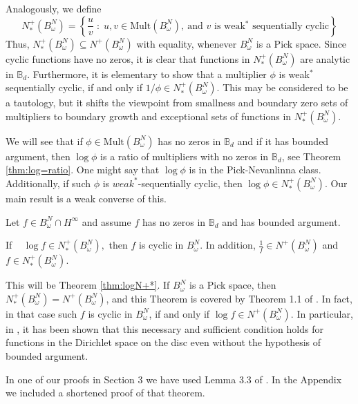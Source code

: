 \documentclass{article}
\numberwithin{equation}{section}
\newcommand{\Bd}{\mathbb B_d}
\begin{document}
Analogously, we define
\begin{equation}
N^{+}_{\ast}(B^{N}_{\omega})
=
\left\{
\frac{u}{v} \;:\; u, v \in \mathrm{Mult}(B^{N}_{\omega}),
\ \text{and } v \text{ is weak$^\ast$ sequentially cyclic}
\right\}
\end{equation}
Thus, $N^{+}_{\ast}(B^{N}_{\omega})\subseteq N^{+}(B^{N}_{\omega})$ with equality, whenever $B^N_\omega$ is a Pick space. Since cyclic functions have no zeros, it is clear that functions in $N^{+}_{\ast}(B^{N}_{\omega})$ are analytic in $\Bd$. Furthermore, it is elementary to show that a multiplier $\phi$ is weak$^\ast$ sequentially cyclic, if and only if $1/\phi\in N^{+}_{\ast}(B^{N}_{\omega})$. This may be considered to be a tautology, but it shifts the viewpoint from smallness and boundary zero sets of multipliers to boundary growth and exceptional sets of functions in $N^{+}_{\ast}(B^{N}_{\omega})$.


We will see that if  $\phi\in \mathrm{Mult}(B^{N}_{\omega})$ has  no zeros in  $\mathbb{B}_d$ and if it  has bounded argument, then  $\log \phi $ is a ratio of multipliers with no zeros in $\mathbb{B}_d$, see Theorem \ref{thm:log=ratio}. One might say that $\log \phi$ is in the Pick-Nevanlinna class. Additionally, if such $\phi$ is $weak^\ast$-sequentially cyclic, then $\log \phi \in N^{+}_{\ast}(B^{N}_{\omega})$. 
Our main result is a weak converse of this.

\begin{thm}
Let $f \in B^{N}_{\omega} \cap H^\infty$ and assume $f$ has no zeros in 
$\mathbb{B}_d$ and has bounded argument. 

  If ~ $ \log f \in N^{+}_{\ast}(B^{N}_{\omega}),$
then $f$ is cyclic in $B^N_\omega$. In addition,
$\frac{1}{f} \in N^{+}(B^{N}_{\omega})$ and $f \in N^{+}_{\ast}(B^{N}_{\omega})$.
\end{thm}

This will be Theorem \ref{thm:logN+*}. If $B^N_\omega$ is a Pick space, then $N^{+}_{\ast}(B^{N}_{\omega})=N^{+}(B^{N}_{\omega})$, and this Theorem is covered by Theorem 1.1 of \cite{Richteriteratedlog}. In fact, in that case such $f$ is cyclic in $B^N_\omega$, if and only if $\log f\in N^+(B^N_\omega)$.  
In particular, in \cite{AlemanRichterDirichletspace2026}, it has been shown that this necessary and sufficient condition holds for functions in the Dirichlet space on the disc even without the hypothesis of bounded argument.

In one of our proofs in Section 3 we have used Lemma 3.3 of \cite{AlemanHartzMcCarthyRichter2023}. In the Appendix we included a shortened proof of that theorem.
\end{document}
